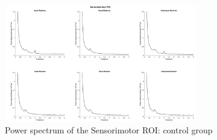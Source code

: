 \begin{figure}[htbp]
    \centering
    \includegraphics[width=0.75\textwidth]{healthy_images/sensorimotorROI_graph.png}
    \caption{Power spectrum of the Sensorimotor ROI: control group}
    \label{fig: Waveforms control: sensorimotor}   
\end{figure}

